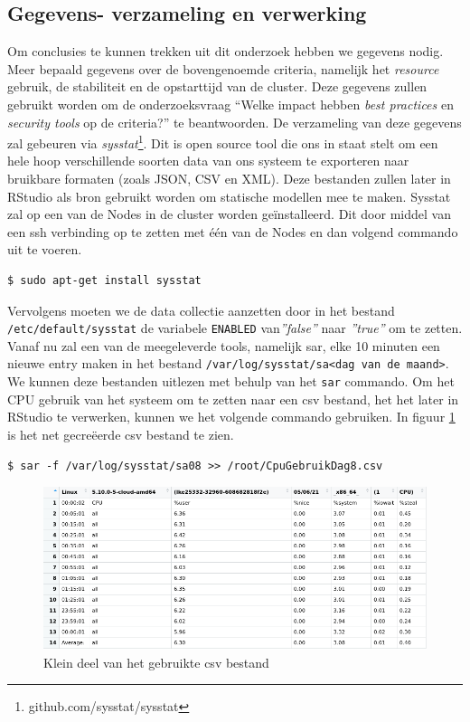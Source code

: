 \subsection{Gegevens- verzameling en verwerking} \label{ch:gegevens}
Om conclusies te kunnen trekken uit dit onderzoek hebben we gegevens nodig. Meer bepaald gegevens over de bovengenoemde criteria, namelijk het \textit{resource} gebruik, de stabiliteit en de opstarttijd van de cluster. Deze gegevens zullen gebruikt worden om de onderzoeksvraag ``Welke impact hebben \textit{best practices} en \textit{security tools} op de criteria?'' te beantwoorden. De verzameling van deze gegevens zal gebeuren via \textit{sysstat}\footnote{github.com/sysstat/sysstat}. Dit is open source tool die ons in staat stelt om een hele hoop verschillende soorten data van ons systeem te exporteren naar bruikbare formaten (zoals JSON, CSV en XML). Deze bestanden zullen later in RStudio als bron gebruikt worden om statische modellen mee te maken. Sysstat zal op een van de Nodes in de cluster worden geïnstalleerd. Dit door middel van een ssh verbinding op te zetten met één van de Nodes en dan volgend commando uit te voeren. 
\begin{verbatim} 
$ sudo apt-get install sysstat
\end{verbatim}

Vervolgens moeten we de data collectie aanzetten door in het bestand \verb|/etc/default/sysstat| de variabele \verb|ENABLED| van\textit{''false''} naar \textit{''true''} om te zetten. Vanaf nu zal een van de meegeleverde tools, namelijk sar, elke 10 minuten een nieuwe entry maken in het bestand \verb|/var/log/sysstat/sa<dag van de maand>|. We kunnen deze bestanden uitlezen met behulp van het \verb|sar| commando. Om het CPU gebruik van het systeem om te zetten naar een csv bestand, het het later in RStudio te verwerken, kunnen we het volgende commando gebruiken. In figuur \ref{fig:CPUDataPreview} is het net gecreëerde csv bestand te zien.

\begin{verbatim} 
$ sar -f /var/log/sysstat/sa08 >> /root/CpuGebruikDag8.csv
\end{verbatim}

\begin{figure}[h]
	\centering
	\includegraphics[width=\linewidth]{img/CPUDataPreview.png}
	\caption{Klein deel van het gebruikte csv bestand}
	\label{fig:CPUDataPreview}
\end{figure}

